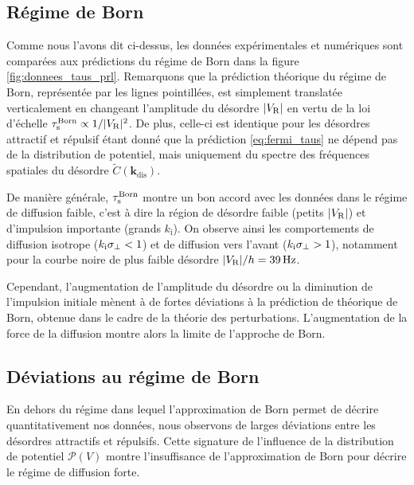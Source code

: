 \subsection{Régime de Born}
Comme nous l'avons dit ci-dessus, les données expérimentales et numériques sont comparées aux prédictions du régime de Born dans la figure \ref{fig:donnees_taus_prl}. Remarquons que la prédiction théorique du régime de Born, représentée par les lignes pointillées, est simplement translatée verticalement en changeant l'amplitude du désordre $|V_{\mathrm{R}}|$ en vertu de la loi d'échelle $\tau_{\mathrm{s}}^{\mathrm{Born}} \propto 1/|V_{\mathrm{R}}|^2$. De plus, celle-ci est identique pour les désordres attractif et répulsif étant donné que la prédiction \ref{eq:fermi_taus} ne dépend pas de la distribution de potentiel, mais uniquement du spectre des fréquences spatiales du désordre $\widetilde{C}(\mathbf{k}_{\mathrm{dis}})$. 

De manière générale, $\tau_{\mathrm{s}}^{\mathrm{Born}}$ montre un bon accord avec les données dans le régime de diffusion faible, c'est à dire la région de désordre faible (petits $|V_{\mathrm{R}}|$) et d'impulsion importante (grands $k_{\mathrm{i}}$). On observe ainsi les comportements de diffusion isotrope ($k_{\mathrm{i}}\sigma_{\perp}<1$) et de diffusion vers l'avant ($k_{\mathrm{i}}\sigma_{\perp}>1$), notamment pour la courbe noire de plus faible désordre $|V_{\mathrm{R}}|/h=\SI{39}{\hertz}$. 

Cependant, l'augmentation de l'amplitude du désordre ou la diminution de l'impulsion initiale mènent à de fortes déviations à la prédiction de théorique de Born, obtenue dans le cadre de la théorie des perturbations. L'augmentation de la force de la diffusion montre alors la limite de l'approche de Born.


\subsection{Déviations au régime de Born}
\label{sc:deviation_regime_born}
En dehors du régime dans lequel l'approximation de Born permet de décrire quantitativement nos données, nous observons de larges déviations entre les désordres attractifs et répulsifs. Cette signature de l'influence de la distribution de potentiel $\mathcal{P}(V)$ montre l'insuffisance de l'approximation de Born pour décrire le régime de diffusion forte.

